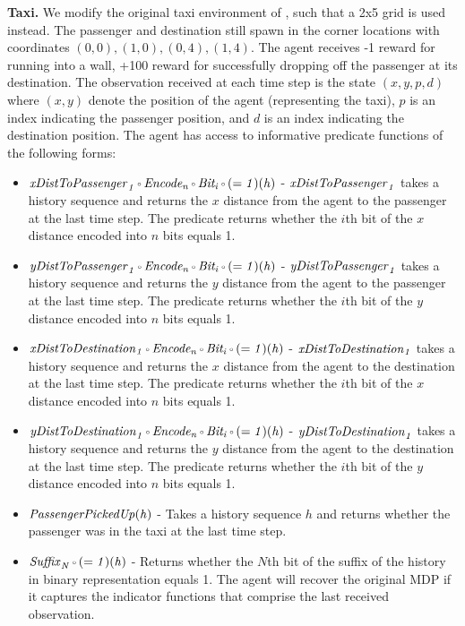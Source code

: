 \textbf{Taxi.} 
We modify the original taxi environment of \cite{FMVRW07}, such that a 2x5 grid is used instead. The passenger and destination still spawn in the corner locations with coordinates $(0,0), (1,0), (0, 4), (1,4)$. The agent receives -1 reward for running into a wall, +100 reward for successfully dropping off the passenger at its destination. The observation received at each time step is the state $(x, y, p, d)$ where $(x, y)$ denote the position of the agent (representing the taxi), $p$ is an index indicating the passenger position, and $d$ is an index indicating the destination position. The agent has access to informative predicate functions of the following forms:
\begin{itemize}
    \item $\it{xDistToPassenger}_{1} \comp Encode_n \comp Bit_i \comp (= 1)(h)$ - $\it{xDistToPassenger}_{1}$ takes a history sequence and returns the $x$ distance from the agent to the passenger at the last time step. The predicate returns whether the $i$th bit of the $x$ distance encoded into $n$ bits equals 1. 
    \item $\it{yDistToPassenger}_{1} \comp Encode_n \comp Bit_i \comp (= 1)(h)$ - $\it{yDistToPassenger}_{1}$ takes a history sequence and returns the $y$ distance from the agent to the passenger at the last time step. The predicate returns whether the $i$th bit of the $y$ distance encoded into $n$ bits equals 1. 
    \item $\it{xDistToDestination}_{1} \comp Encode_n \comp Bit_i \comp (= 1)(h)$ - $\it{xDistToDestination}_{1}$ takes a history sequence and returns the $x$ distance from the agent to the destination at the last time step. The predicate returns whether the $i$th bit of the $x$ distance encoded into $n$ bits equals 1. 
    \item $\it{yDistToDestination}_{1} \comp Encode_n \comp Bit_i \comp (= 1)(h)$ - $\it{yDistToDestination}_{1}$ takes a history sequence and returns the $y$ distance from the agent to the destination at the last time step. The predicate returns whether the $i$th bit of the $y$ distance encoded into $n$ bits equals 1. 
    \item $\it{PassengerPickedUp}(h)$ - Takes a history sequence $h$ and returns whether the passenger was in the taxi at the last time step. 
    \item $\it{Suffix}_N \comp (= 1) (h)$ - Returns whether the $N$th bit of the suffix of the history in binary representation equals 1. The agent will recover the original MDP if it captures the indicator functions that comprise the last received observation.
\end{itemize}

